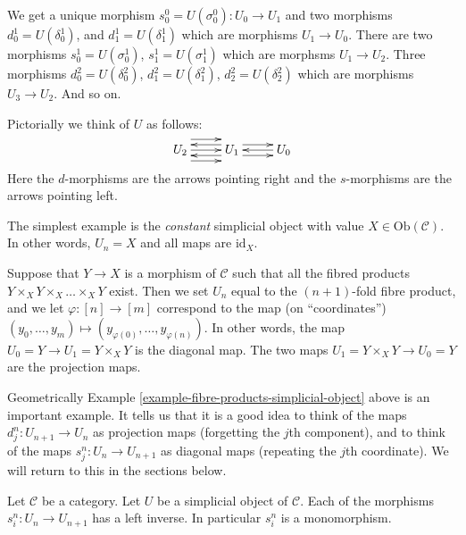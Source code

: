 \noindent
We get a unique morphism $s^0_0 = U(\sigma^0_0) : U_0 \to U_1$ and
two morphisms $d^1_0 = U(\delta^1_0)$, and
$d^1_1 = U(\delta^1_1)$ which are morphisms $U_1 \to U_0$.
There are two morphisms $s^1_0 = U(\sigma^1_0)$, $s^1_1 = U(\sigma^1_1)$
which are morphsms $U_1 \to U_2$. Three morphisms
$d^2_0 = U(\delta^2_0)$, $d^2_1 = U(\delta^2_1)$, $d^2_2 = U(\delta^2_2)$
which are morphisms $U_3 \to U_2$. And so on.

\medskip\noindent
Pictorially we think of $U$ as follows:
$$
\xymatrix{
U_2
\ar@<2ex>[r]
\ar@<0ex>[r]
\ar@<-2ex>[r]
&
U_1
\ar@<1ex>[r]
\ar@<-1ex>[r]
\ar@<1ex>[l]
\ar@<-1ex>[l]
&
U_0
\ar@<0ex>[l]
}
$$
Here the $d$-morphisms are the arrows pointing right and the
$s$-morphisms are the arrows pointing left.

\begin{example}
\label{example-constant-simplicial-object}
The simplest example is the {\it constant} simplicial object with
value $X \in \text{Ob}(\mathcal{C})$. In other words, $U_n = X$ and
all maps are $\text{id}_X$.
\end{example}

\begin{example}
\label{example-fibre-products-simplicial-object}
Suppose that $Y\to X$ is a morphism of $\mathcal{C}$ such that all
the fibred products $Y\times_X Y \times_X \ldots \times_X Y$ exist.
Then we set $U_n$ equal to the $(n + 1)$-fold fibre product,
and we let $\varphi: [n] \to [m]$ correspond to the map
(on ``coordinates'')
$(y_0, \ldots, y_m) \mapsto (y_{\varphi(0)}, \ldots, y_{\varphi(n)})$.
In other words, the map $U_0 = Y \to U_1 = Y\times_X Y$ is the
diagonal map. The two maps $U_1 = Y\times_X Y \to U_0 = Y$ are the
projection maps.
\end{example}

\noindent
Geometrically Example \ref{example-fibre-products-simplicial-object}
above is an important example. It tells us that it is a good
idea to think of the maps $d^n_j : U_{n + 1} \to U_n$
as projection maps (forgetting the $j$th component),
and to think of the maps $s^n_j : U_n \to U_{n + 1}$
as diagonal maps (repeating the $j$th coordinate).
We will return to this in the sections below.

\begin{lemma}
\label{lemma-si-injective}
Let $\mathcal{C}$ be a category.
Let $U$ be a simplicial object of $\mathcal{C}$.
Each of the morphisms $s^n_i : U_n \to U_{n + 1}$
has a left inverse. In particular $s^n_i$ is a monomorphism.
\end{lemma}

